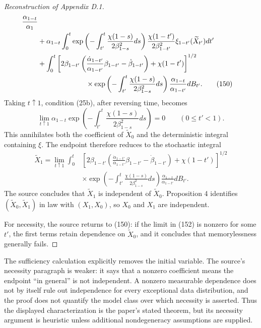 \begin{proof}[Reconstruction of Appendix D.1]
\begin{align*}
 \frac{\alpha_{1-t}}{\alpha_1}\\
 &+\alpha_{1-t}\int_0^t
 \exp\left(-\int_{t'}^t\frac{\chi(1-s)}{2\beta_{1-s}^2}ds\right)
 \frac{\chi(1-t')}{2\beta_{1-t'}^2}
 \xi_{1-t'}(\widetilde X_{t'})dt'\\
 &+\int_0^t
 \left[
 2\beta_{1-t'}
 \left(\frac{\dot\alpha_{1-t'}}{\alpha_{1-t'}}\beta_{1-t'}-\dot\beta_{1-t'}\right)
 +\chi(1-t')
 \right]^{1/2}\\
 &\hspace{2.4cm}\times
 \exp\left(-\int_{t'}^t\frac{\chi(1-s)}{2\beta_{1-s}^2}ds\right)
 \frac{\alpha_{1-t}}{\alpha_{1-t'}}dB_{t'}.
 \tag{150}
\end{align*}
Taking $t\uparrow1$, condition (25b), after reversing time, becomes
\begin{equation*}
 \lim_{t\uparrow1}
 \alpha_{1-t}
 \exp\left(-\int_{t'}^t\frac{\chi(1-s)}{2\beta_{1-s}^2}ds\right)=0
 \qquad(0\le t'<1).
 \tag{152}
\end{equation*}
This annihilates both the coefficient of $\widetilde X_0$ and the deterministic integral containing $\xi$.  The endpoint therefore reduces to the stochastic integral
\begin{align*}
 \widetilde X_1
 =\lim_{t\uparrow1}\int_0^t
 &\left[
 2\beta_{1-t'}
 \left(\frac{\dot\alpha_{1-t'}}{\alpha_{1-t'}}\beta_{1-t'}-\dot\beta_{1-t'}\right)
 +\chi(1-t')
 \right]^{1/2}\\
 &\times
 \exp\left(-\int_{t'}^t\frac{\chi(1-s)}{2\beta_{1-s}^2}ds\right)
 \frac{\alpha_{1-t}}{\alpha_{1-t'}}dB_{t'}.
 \tag{154}
\end{align*}
The source concludes that $\widetilde X_1$ is independent of $\widetilde X_0$.  Proposition 4 identifies
$(\widetilde X_0,\widetilde X_1)$ in law with $(X_1,X_0)$, so $X_0$ and $X_1$ are independent.

For necessity, the source returns to (150): if the limit in (152) is nonzero for some $t'$, the first terms retain dependence on $\widetilde X_0$, and it concludes that memorylessness generally fails.
\end{proof}

\begin{remark}
The sufficiency calculation explicitly removes the initial variable.  The source's necessity paragraph is weaker: it says that a nonzero coefficient means the endpoint ``in general'' is not independent.  A nonzero measurable dependence does not by itself rule out independence for every exceptional data distribution, and the proof does not quantify the model class over which necessity is asserted.  Thus the displayed characterization is the paper's stated theorem, but its necessity argument is heuristic unless additional nondegeneracy assumptions are supplied.
\end{remark}

